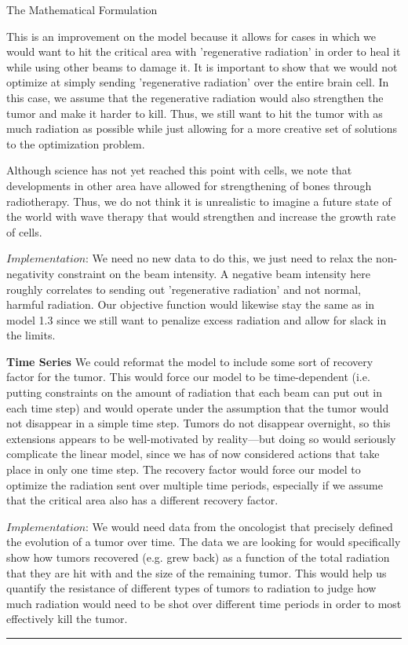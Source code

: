 \documentclass[12pt]{article}
\makeatletter
\newenvironment{task}{\@startsection
       {section}{1}
       {0.4em}{-.5ex plus -1ex minus -.2ex}{.5ex plus .2ex}
       {\pagebreak[3]\large\bf\noindent{Task}}}
       {\nopagebreak[3]\vspace{3ex}\begin{center}\rule{1\linewidth}{.3pt}\end{center}}
\makeatother
\begin{document}
\begin{task}{The Mathematical Formulation}
\begin{enumerate}
This is an improvement on the model because it allows for cases in which we would want to hit the critical area with 'regenerative radiation' in order to heal it while using other beams to damage it. It is important to show that we would not optimize at simply sending 'regenerative radiation' over the entire brain cell. In this case, we assume that the regenerative radiation would also strengthen the tumor and make it harder to kill. Thus, we still want to hit the tumor with as much radiation as possible while just allowing for a more creative set of solutions to the optimization problem. 

Although science has not yet reached this point with cells, we note that developments in other area have allowed for strengthening of bones through radiotherapy. Thus, we do not think it is unrealistic to imagine a future state of the world with wave therapy that would strengthen and increase the growth rate of cells. 

$Implementation$: We need no new data to do this, we just need to relax the non-negativity constraint on the beam intensity. A negative beam intensity here roughly correlates to sending out 'regenerative radiation' and not normal, harmful radiation. Our objective function would likewise stay the same as in model 1.3 since we still want to penalize excess radiation and allow for slack in the limits. 

\textbf{Time Series}
We could reformat the model to include some sort of recovery factor for the tumor. This would force our model to be time-dependent (i.e. putting constraints on the amount of radiation that each beam can put out in each time step) and would operate under the assumption that the tumor would not disappear in a simple time step. Tumors do not disappear overnight, so this extensions appears to be well-motivated by reality—but doing so would seriously complicate the linear model, since we has of now considered actions that take place in only one time step. The recovery factor would force our model to optimize the radiation sent over multiple time periods, especially if we assume that the critical area also has a different recovery factor.  

$Implementation$: We would need data from the oncologist that precisely defined the evolution of a tumor over time. The data we are looking for would specifically show how tumors recovered (e.g. grew back) as a function of the total radiation that they are hit with and the size of the remaining tumor. This would help us quantify the resistance of different types of tumors to radiation to judge how much radiation would need to be shot over different time periods in order to most effectively kill the tumor. 


\end{enumerate}
\end{task}
\end{document}
